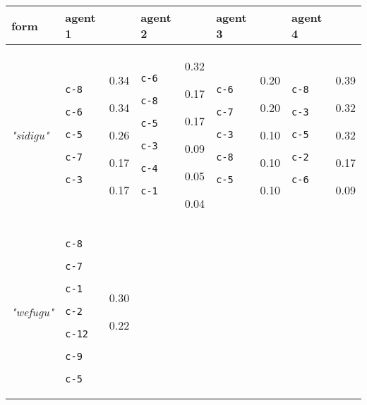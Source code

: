 
{\footnotesize\renewcommand{\arraystretch}{1.5}
\begin{tabular}{@{}p{1.2cm}|p{1.3cm}@{}p{0.8cm}@{}|p{1.3cm}@{}p{0.8cm}@{}|p{1.3cm}@{}p{0.8cm}@{}|p{1.3cm}@{}p{0.8cm}@{}}
form & agent 1 &  & agent 2 &  & agent 3 &  & agent 4 & \\
\hline
\textit{"sidigu"} & \texttt{c-8}

\texttt{c-6}

\texttt{c-5}

\texttt{c-7}

\texttt{c-3} & 0.34

0.34

0.26

0.17

0.17 & \texttt{c-6}

\texttt{c-8}

\texttt{c-5}

\texttt{c-3}

\texttt{c-4}

\texttt{c-1} & 0.32

0.17

0.17

0.09

0.05

0.04 & \texttt{c-6}

\texttt{c-7}

\texttt{c-3}

\texttt{c-8}

\texttt{c-5} & 0.20

0.20

0.10

0.10

0.10 & \texttt{c-8}

\texttt{c-3}

\texttt{c-5}

\texttt{c-2}

\texttt{c-6} & 0.39

0.32

0.32

0.17

0.09\\
\hline
\textit{"wefugu"} & \texttt{c-8}

\texttt{c-7}

\texttt{c-1}

\texttt{c-2}

\texttt{c-12}

\texttt{c-9}

\texttt{c-5} & 0.30

0.22


\end{tabular}}
